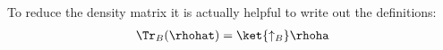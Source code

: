 To reduce the density matrix it is actually helpful to write out the definitions:
\begin{align}
\Tr_B(\rhohat) = \ket{\uparrow_B}\rhoha
\end{align}